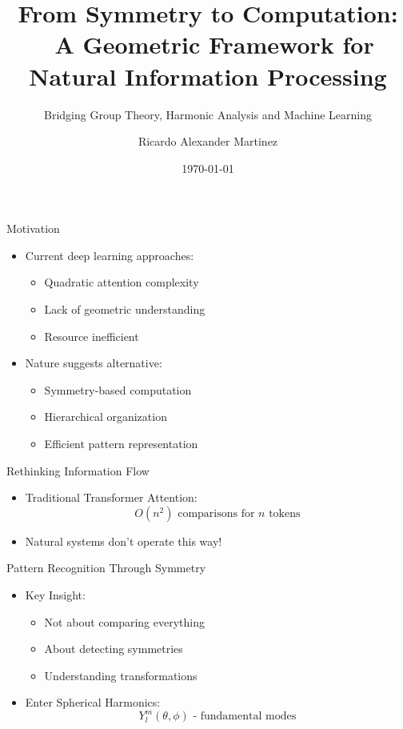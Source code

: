 \documentclass{beamer}
\title{From Symmetry to Computation: \
A Geometric Framework for Natural Information Processing}
\subtitle{Bridging Group Theory, Harmonic Analysis and Machine Learning}
\author{Ricardo Alexander Martinez}
\institute{Department of Computer Science\
Institution}
\date{\today}
\begin{document}
\begin{frame}
\titlepage
\end{frame}
\begin{frame}{Motivation}
\begin{itemize}
\item Current deep learning approaches:
\begin{itemize}
\item Quadratic attention complexity
\item Lack of geometric understanding
\item Resource inefficient
\end{itemize}
\item Nature suggests alternative:
\begin{itemize}
\item Symmetry-based computation
\item Hierarchical organization
\item Efficient pattern representation
\end{itemize}
\end{itemize}
\end{frame}
\begin{frame}{Rethinking Information Flow}
\begin{itemize}
\item Traditional Transformer Attention:
\begin{equation*}
O(n^2) \text{ comparisons for } n \text{ tokens}
\end{equation*}
\pause
\item Natural systems don't operate this way!
\end{itemize}
\end{frame}
\begin{frame}{Pattern Recognition Through Symmetry}
\begin{itemize}
\item Key Insight:
\begin{itemize}
\item Not about comparing everything
\item About detecting symmetries
\item Understanding transformations
\end{itemize}
\pause
\item Enter Spherical Harmonics:
\begin{equation*}
Y_l^m(\theta,\phi) \text{ - fundamental modes}
\end{equation*}
\end{itemize}
\end{frame}
\end{document}
